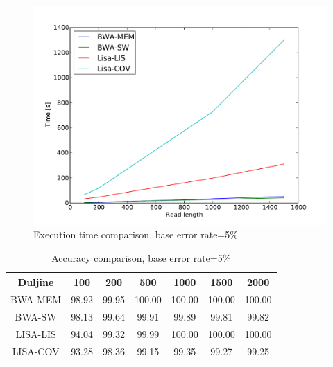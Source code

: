 \documentclass[times, utf8, diplomski]{fer}
\begin{document}
\begin{figure}[H]
\centering
\includegraphics[width=1.0\textwidth]{../img/banana-e05-time.pdf}
\caption{Execution time comparison, base error rate=5\%}\label{banana-e05-time}
\end{figure}

\begin{table}[H]
\centering
\begin{tabular}{|c||c|c|c|c|c|c|}
\hline
	Duljine & 100 & 200 & 500 & 1000 & 1500 & 2000\\
\hline
\hline
	BWA-MEM & 98.92 & 99.95 & 100.00 & 100.00 & 100.00 & 100.00\\
\hline
	BWA-SW  & 98.13 & 99.64 & 99.91 & 99.89 & 99.81 & 99.82\\
\hline
	LISA-LIS  & 94.04 & 99.32 & 99.99 & 100.00 & 100.00 & 100.00\\
\hline
	LISA-COV & 93.28 & 98.36 & 99.15 & 99.35 & 99.27 & 99.25\\
\hline
\end{tabular}
\caption{Accuracy comparison, base error rate=5\%}\label{banana-e05-correct}
\end{table}
\end{document}
